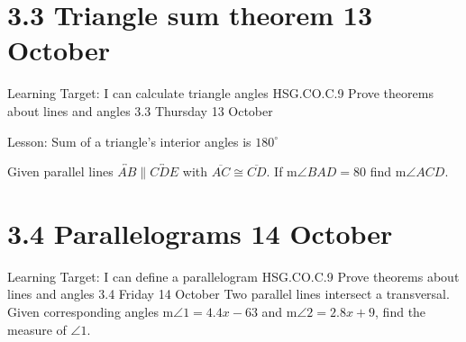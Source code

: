 \section{3.3 Triangle sum theorem \hfill 13 October}
\begin{frame}{Learning Target: I can calculate triangle angles}
  {HSG.CO.C.9 Prove theorems about lines and angles  \hfill \alert{3.3 Thursday 13 October}}

  Lesson: Sum of a triangle's interior angles is $180^\circ$
\end{frame}

\begin{frame}
  Given parallel lines $\overleftrightarrow{AB} \parallel \overleftrightarrow{CDE}$ with $\overline{AC} \cong \overline{CD}$. If m$\angle BAD=80$ find m$\angle ACD$.
  \begin{flushright}
  \end{flushright} \vspace{1cm}
  \end{frame}

\section{3.4 Parallelograms \hfill 14 October}
\begin{frame}{Learning Target: I can define a parallelogram}
  {HSG.CO.C.9 Prove theorems about lines and angles  \hfill \alert{3.4 Friday 14 October}}
  Two parallel lines intersect a transversal. Given corresponding angles  m$\angle 1 = 4.4x - 63$ and m$\angle 2 = 2.8x+9$, find the measure of $\angle 1$. 
  \begin{flushright}
    \end{flushright}
\end{frame}

